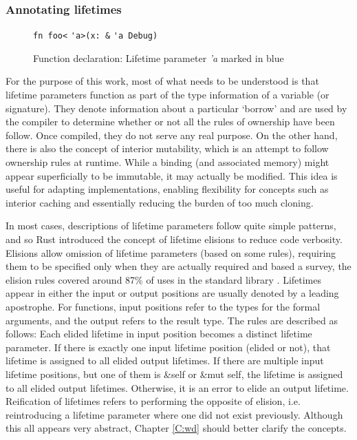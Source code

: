 \subsubsection{Annotating lifetimes}
\begin{figure}[H]
\centering
{\verb|fn foo<|}{\color{blue} \verb|'a|}{\verb|>(x: &|}
{\color{blue} \verb|'a|}{\verb| Debug)|}
\caption{Function declaration: Lifetime parameter \emph{'a} marked in blue}
\end{figure}

For the purpose of this work, most of what needs to be understood is that lifetime parameters function as part of the type information of a variable (or signature). They denote information about a particular `borrow' and are used by the compiler to determine whether or not all the rules of ownership have been follow. Once compiled, they do not serve any real purpose. On the other hand, there is also the concept of interior mutability, which is an attempt to follow ownership rules at runtime. While a binding (and associated memory) might appear superficially to be immutable, it may actually be modified. This idea is useful for adapting implementations, enabling flexibility for concepts such as interior caching and essentially reducing the burden of too much cloning.


In most cases, descriptions of lifetime parameters follow quite simple patterns, and so Rust introduced the concept of lifetime elisions to reduce code verbosity. Elisions allow omission of lifetime parameters (based on some rules), requiring them to be specified only when they are actually required and based a survey, the elision rules covered around 87\% of uses in the standard library \cite{elisionrules}. Lifetimes appear in either the input or output positions are usually denoted by a leading apostrophe. For functions, input positions refer to the types for the formal arguments, and the output refers to the result type. The rules are described as follows: Each elided lifetime in input position becomes a distinct lifetime parameter. If there is exactly one input lifetime position (elided or not), that lifetime is assigned to all elided output lifetimes. If there are multiple input lifetime positions, but one of them is \&self or \&mut self, the lifetime is assigned to all elided output lifetimes. Otherwise, it is an error to elide an output lifetime.  Reification of lifetimes refers to performing the opposite of elision, i.e. reintroducing a lifetime parameter where one did not exist previously. Although this all appears very abstract, Chapter \ref{C:wd} should better clarify the concepts. 

